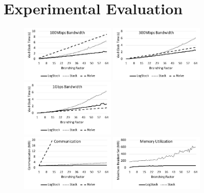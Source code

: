 \section{Experimental Evaluation}\label{sec:eval}

\begin{figure}[t]
  \begin{adjustwidth}{-0.13\textwidth}{-0.13\textwidth}
  	\centering
    \includegraphics[width=0.4\textwidth]{fig/100mbps}
    \includegraphics[width=0.4\textwidth]{fig/300mbps}
    \includegraphics[width=0.4\textwidth]{fig/1gbps}
  	\\
    \includegraphics[width=0.4\textwidth]{fig/comm}
    \includegraphics[width=0.4\textwidth]{fig/memutil}
  \end{adjustwidth}
  \caption{%
  }\label{fig:plots}
\end{figure}
